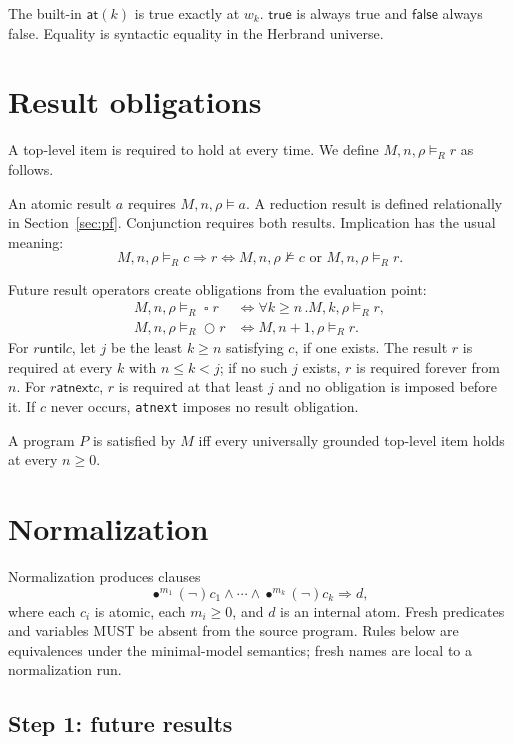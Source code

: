 \documentclass[11pt]{article}
\newcommand{\prev}{\mathbin{\bullet}}
\newcommand{\alwaysfuture}{\mathbin{\square}}
\newcommand{\true}{\mathsf{true}}
\newcommand{\false}{\mathsf{false}}
\newcommand{\at}{\mathsf{at}}
\newcommand{\until}{\mathbin{\mathsf{until}}}
\newcommand{\atnext}{\mathbin{\mathsf{atnext}}}
\begin{document}
The built-in $\at(k)$ is true exactly at $w_k$.  $\true$ is always true and
$\false$ always false.  Equality is syntactic equality in the Herbrand
universe.

\section{Result obligations}

A top-level item is required to hold at every time.  We define
$M,n,\rho\models_R r$ as follows.

An atomic result $a$ requires $M,n,\rho\models a$.  A reduction result is
defined relationally in Section~\ref{sec:pf}.  Conjunction requires both
results.  Implication has the usual meaning:
\[
M,n,\rho\models_R c\Rightarrow r
\Longleftrightarrow M,n,\rho\not\models c\text{ or }M,n,\rho\models_R r.
\]

Future result operators create obligations from the evaluation point:
\begin{align*}
M,n,\rho\models_R \alwaysfuture r
&\Longleftrightarrow \forall k\ge n\,. M,k,\rho\models_R r,\\
M,n,\rho\models_R \bigcirc r
&\Longleftrightarrow M,n+1,\rho\models_R r.
\end{align*}
For $r\until c$, let $j$ be the least $k\ge n$ satisfying $c$, if one
exists.  The result $r$ is required at every $k$ with $n\le k<j$; if no such
$j$ exists, $r$ is required forever from $n$.  For $r\atnext c$, $r$ is
required at that least $j$ and no obligation is imposed before it.  If $c$
never occurs, \verb|atnext| imposes no result obligation.

A program $P$ is satisfied by $M$ iff every universally grounded top-level
item holds at every $n\ge0$.

\section{Normalization}\label{sec:normalization}

Normalization produces clauses
\[
\prev^{m_1}(\neg)c_1\wedge\cdots\wedge
\prev^{m_k}(\neg)c_k\Rightarrow d,
\]
where each $c_i$ is atomic, each $m_i\ge0$, and $d$ is an internal atom.
Fresh predicates and variables MUST be absent from the source program.  Rules
below are equivalences under the minimal-model semantics; fresh names are
local to a normalization run.

\subsection{Step 1: future results}
\end{document}
